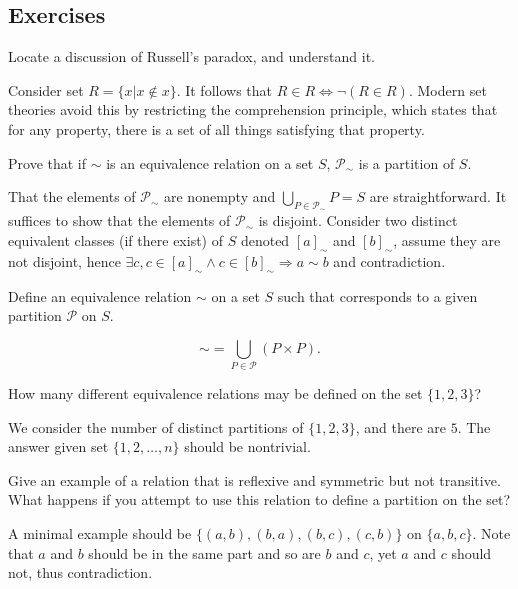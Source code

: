 \subsection*{Exercises}

\begin{exercise}
  Locate a discussion of Russell’s paradox, and understand it.
\end{exercise}

Consider set $R=\{x|x\notin x\}$. It follows that $R\in R \Leftrightarrow\neg(R\in R)$. Modern set theories avoid this by restricting the comprehension principle, which states that for any property, there is a set of all things satisfying that property.

\begin{exercise}
  Prove that if $\sim$ is an equivalence relation on a set $S$, $\mathcal{P}_{\sim}$ is a partition of $S$.
\end{exercise}

That the elements of $\mathcal{P}_{\sim}$ are nonempty and $\bigcup_{P\in \mathcal{P}_{\sim}}P=S$ are straightforward. It suffices to show that the elements of $\mathcal{P}_{\sim}$ is disjoint. Consider two distinct equivalent classes (if there exist) of $S$ denoted $[a]_{\sim}$ and $[b]_{\sim}$, assume they are not disjoint, hence $\exists c, c\in[a]_{\sim}\wedge c\in[b]_{\sim}\Rightarrow a\sim b$ and contradiction.

\begin{exercise}
  Define an equivalence relation $\sim$ on a set $S$ such that corresponds to a given partition $\mathcal{P}$ on $S$.
\end{exercise}

\[
  \sim=\bigcup_{P\in \mathcal{P}}(P\times P).
\]

\begin{exercise}
  How many diﬀerent equivalence relations may be defined on the set $\{1,2,3\}$?
\end{exercise}

We consider the number of distinct partitions of $\{1,2,3\}$, and there are $5$. The answer given set $\{1,2,\dots,n\}$ should be nontrivial.

\begin{exercise}
  Give an example of a relation that is reflexive and symmetric but not transitive. What happens if you attempt to use this relation to define a partition on the set?
\end{exercise}

A minimal example should be $\{(a,b),(b,a),(b,c),(c,b)\}$ on $\{a,b,c\}$. Note that $a$ and $b$ should be in the same part and so are $b$ and $c$, yet $a$ and $c$ should not, thus contradiction.

